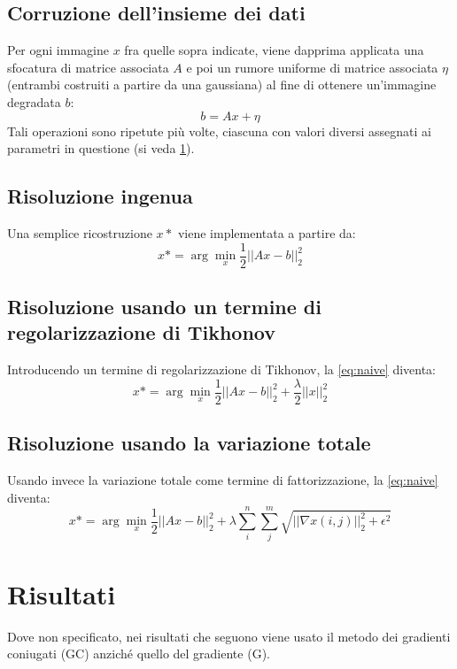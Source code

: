 \documentclass[a4paper]{article}
\begin{document}
\subsection{Corruzione dell'insieme dei dati}
Per ogni immagine $x$ fra quelle sopra indicate, viene dapprima applicata una
sfocatura di matrice associata $A$ e poi un rumore uniforme di matrice associata
$\eta$ (entrambi costruiti a partire da una gaussiana) al fine di ottenere
un'immagine degradata $b$:
\begin{equation}
  b = Ax + \eta
\end{equation}
Tali operazioni sono ripetute più volte, ciascuna con valori diversi assegnati
ai parametri in questione (si veda \ref{results}).

\subsection{Risoluzione ingenua}
Una semplice ricostruzione $x*$ viene implementata a partire da:
\begin{equation}\label{eq:naive}
  x* = \arg \min_{x} \frac{1}{2}||Ax - b||^2_2
\end{equation}

\subsection{Risoluzione usando un termine di regolarizzazione di Tikhonov}
Introducendo un termine di regolarizzazione di Tikhonov, la \ref{eq:naive}
diventa:
\begin{equation}
  x* = \arg \min_{x} \frac{1}{2}||Ax - b||^2_2 + \frac{\lambda}{2}||x||^2_2
\end{equation}

\subsection{Risoluzione usando la variazione totale}
Usando invece la variazione totale come termine di fattorizzazione, la
\ref{eq:naive} diventa:
\begin{equation}
  x* = \arg \min_{x} \frac{1}{2}||Ax - b||^2_2 +
  \lambda\sum_i^n\sum_j^m\sqrt{||\nabla x(i,j)||_2^2+\epsilon^2}
\end{equation}

\section{Risultati} \label{results}
Dove non specificato, nei risultati che seguono viene usato il metodo dei
gradienti coniugati (GC) anziché quello del gradiente (G). 
\end{document}
